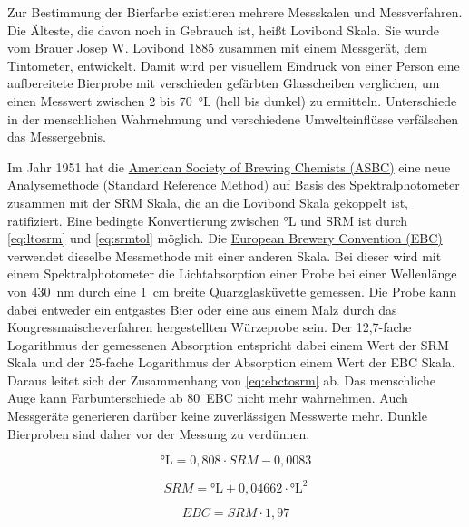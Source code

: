 \documentclass[a4paper,parskip=half]{scrartcl}
\newcommand{\EBC}{\mathit{EBC}}
\newcommand{\SRM}{\mathit{SRM}}
\begin{document}
Zur Bestimmung der Bierfarbe existieren mehrere Messskalen und Messverfahren. Die Älteste, die davon noch in Gebrauch ist, heißt Lovibond Skala. Sie wurde vom Brauer Josep W. Lovibond 1885 zusammen mit einem Messgerät, dem Tintometer, entwickelt. Damit wird per visuellem Eindruck von einer Person eine aufbereitete Bierprobe mit verschieden gefärbten Glasscheiben verglichen, um einen Messwert zwischen 2 bis 70~°L (hell bis dunkel) zu ermitteln. Unterschiede in der menschlichen Wahrnehmung und verschiedene Umwelteinflüsse verfälschen das Messergebnis. \parencite{KrausWeyermann2021a}

Im Jahr 1951 hat die \href{https://www.asbcnet.org}{American Society of Brewing Chemists (ASBC)} eine neue Analysemethode (Standard Reference Method) auf Basis des Spektralphotometer zusammen mit der SRM Skala, die an die Lovibond Skala gekoppelt ist, ratifiziert. Eine bedingte Konvertierung zwischen °L und SRM ist durch \autoref{eq:ltosrm} und \autoref{eq:srmtol} möglich. Die \href{https://europeanbreweryconvention.eu}{European Brewery Convention (EBC)} verwendet dieselbe Messmethode mit einer anderen Skala. Bei dieser wird mit einem Spektralphotometer die Lichtabsorption einer Probe bei einer Wellenlänge von 430~nm durch eine 1~cm breite Quarzglasküvette gemessen. Die Probe kann dabei entweder ein entgastes Bier oder eine aus einem Malz durch das Kongressmaischeverfahren hergestellten Würzeprobe sein. Der 12,7-fache Logarithmus der gemessenen Absorption entspricht dabei einem Wert der SRM Skala und der 25-fache Logarithmus der Absorption einem Wert der EBC Skala. Daraus leitet sich der Zusammenhang von \autoref{eq:ebctosrm} ab. Das menschliche Auge kann Farbunterschiede ab 80~EBC nicht mehr wahrnehmen. Auch Messgeräte generieren darüber keine zuverlässigen Messwerte mehr. Dunkle Bierproben sind daher vor der Messung zu verdünnen. \parencite{KrausWeyermann2021a}

\begin{equation}
\textrm{°L} = 0,808 \cdot \SRM - 0,0083
\label{eq:ltosrm}
\end{equation}

\begin{equation}
\SRM = \textrm{°L} + 0,04662 \cdot \textrm{°L}^2
\label{eq:srmtol}
\end{equation}

\begin{equation}
\EBC = \SRM \cdot 1,97
\label{eq:ebctosrm}
\end{equation}

\parencite{Bies2010}
\parencite{Tucker2017}
\parencite{Lange2016}
\parencite{Shellhammer2009}
\end{document}
